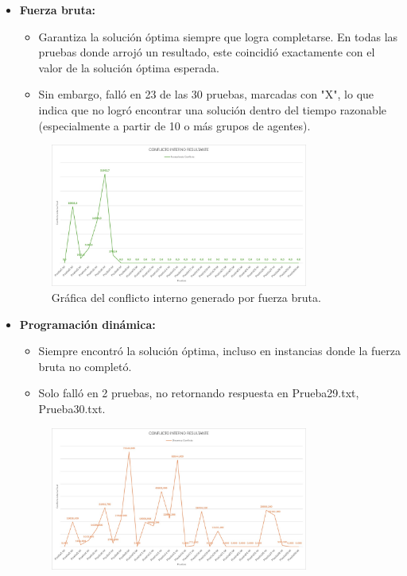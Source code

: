 \documentclass[11pt,letter]{article}
\begin{document}
    \begin{itemize}
        \item \textbf{Fuerza bruta:}
        \begin{itemize}
            \item Garantiza la solución óptima siempre que logra completarse. En todas las pruebas donde arrojó un resultado, este coincidió exactamente con el valor de la solución óptima esperada.
            \item Sin embargo, falló en 23 de las 30 pruebas, marcadas con "X", lo que indica que no logró encontrar una solución dentro del tiempo razonable (especialmente a partir de 10 o más grupos de agentes).
        \end{itemize}
        \begin{figure}[H]
            \centering
            \includegraphics[width=0.8\textwidth]{resources/conflicto1.jpeg}
            \caption{Gráfica del conflicto interno generado por fuerza bruta.}
        \end{figure}
        \item \textbf{Programación dinámica:}
        \begin{itemize}
            \item Siempre encontró la solución óptima, incluso en instancias donde la fuerza bruta no completó.
            \item Solo falló en 2 pruebas, no retornando respuesta en Prueba29.txt, Prueba30.txt.
        \end{itemize}
        \begin{figure}[H]
            \centering
            \includegraphics[width=0.8\textwidth]{resources/conflicto2.jpeg}

\end{figure}
\end{itemize}
\end{document}
